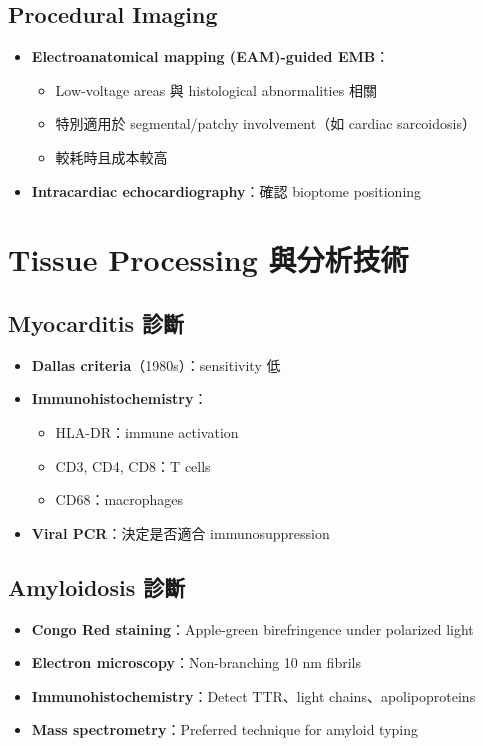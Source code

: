 \documentclass[12pt,a4paper]{article}
\begin{document}
\subsection{Procedural Imaging}

\begin{itemize}
    \item \textbf{Electroanatomical mapping (EAM)-guided EMB}：
    \begin{itemize}
        \item Low-voltage areas 與 histological abnormalities 相關
        \item 特別適用於 segmental/patchy involvement（如 cardiac sarcoidosis）
        \item 較耗時且成本較高
    \end{itemize}
    \item \textbf{Intracardiac echocardiography}：確認 bioptome positioning
\end{itemize}

\section{Tissue Processing 與分析技術}

\subsection{Myocarditis 診斷}

\begin{itemize}
    \item \textbf{Dallas criteria}（1980s）：sensitivity 低
    \item \textbf{Immunohistochemistry}：
    \begin{itemize}
        \item HLA-DR：immune activation
        \item CD3, CD4, CD8：T cells
        \item CD68：macrophages
    \end{itemize}
    \item \textbf{Viral PCR}：決定是否適合 immunosuppression
\end{itemize}

\subsection{Amyloidosis 診斷}

\begin{itemize}
    \item \textbf{Congo Red staining}：Apple-green birefringence under polarized light
    \item \textbf{Electron microscopy}：Non-branching 10 nm fibrils
    \item \textbf{Immunohistochemistry}：Detect TTR、light chains、apolipoproteins
    \item \textbf{Mass spectrometry}：Preferred technique for amyloid typing
\end{itemize}
\end{document}
